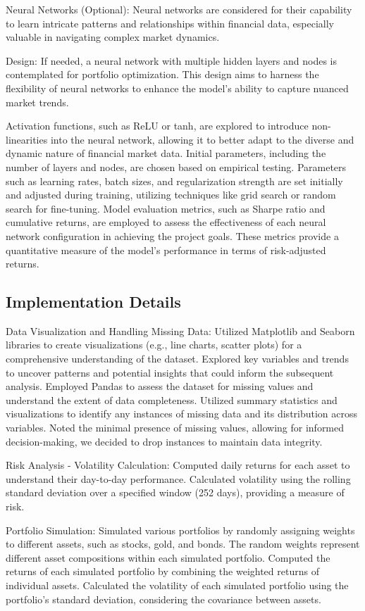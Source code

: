 \documentclass[conference]{IEEEtran}
\begin{document}
Neural Networks (Optional):
Neural networks are considered for their capability to learn intricate patterns and relationships within financial data, especially valuable in navigating complex market dynamics. 

Design: If needed, a neural network with multiple hidden layers and nodes is contemplated for portfolio optimization. This design aims to harness the flexibility of neural networks to enhance the model's ability to capture nuanced market trends.

Activation functions, such as ReLU or tanh, are explored to introduce non-linearities into the neural network, allowing it to better adapt to the diverse and dynamic nature of financial market data. Initial parameters, including the number of layers and nodes, are chosen based on empirical testing. Parameters such as learning rates, batch sizes, and regularization strength are set initially and adjusted during training, utilizing techniques like grid search or random search for fine-tuning. Model evaluation metrics, such as Sharpe ratio and cumulative returns, are employed to assess the effectiveness of each neural network configuration in achieving the project goals. These metrics provide a quantitative measure of the model's performance in terms of risk-adjusted returns.

\subsection{Implementation Details}
Data Visualization and Handling Missing Data:
Utilized Matplotlib and Seaborn libraries to create visualizations (e.g., line charts, scatter plots) for a comprehensive understanding of the dataset. Explored key variables and trends to uncover patterns and potential insights that could inform the subsequent analysis. Employed Pandas to assess the dataset for missing values and understand the extent of data completeness. Utilized summary statistics and visualizations to identify any instances of missing data and its distribution across variables. Noted the minimal presence of missing values, allowing for informed decision-making, we decided to drop instances to maintain data integrity.

Risk Analysis - Volatility Calculation:
Computed daily returns for each asset to understand their day-to-day performance. Calculated volatility using the rolling standard deviation over a specified window (252 days), providing a measure of risk.

Portfolio Simulation:
Simulated various portfolios by randomly assigning weights to different assets, such as stocks, gold, and bonds. The random weights represent different asset compositions within each simulated portfolio. Computed the returns of each simulated portfolio by combining the weighted returns of individual assets. Calculated the volatility of each simulated portfolio using the portfolio's standard deviation, considering the covariance between assets.
\end{document}

